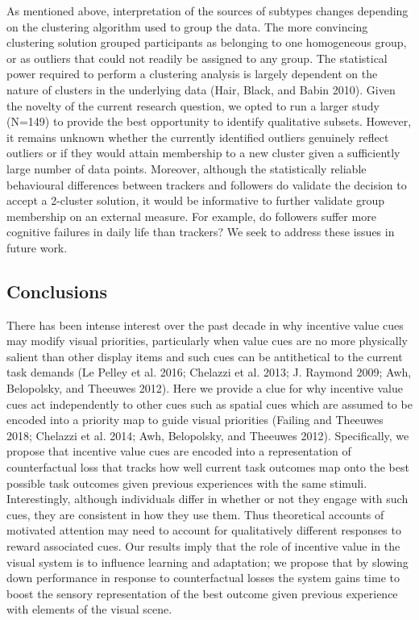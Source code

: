 \documentclass[11pt,halfline,a4paper,]{ouparticle}
\begin{document}
As mentioned above, interpretation of the sources of subtypes changes depending on the clustering algorithm used to group the data. The more convincing clustering solution grouped participants as belonging to one homogeneous group, or as outliers that could not readily be assigned to any group. The statistical power required to perform a clustering analysis is largely dependent on the nature of clusters in the underlying data (Hair, Black, and Babin 2010). Given the novelty of the current research question, we opted to run a larger study (N=149) to provide the best opportunity to identify qualitative subsets. However, it remains unknown whether the currently identified outliers genuinely reflect outliers or if they would attain membership to a new cluster given a sufficiently large number of data points. Moreover, although the statistically reliable behavioural differences between trackers and followers do validate the decision to accept a 2-cluster solution, it would be informative to further validate group membership on an external measure. For example, do followers suffer more cognitive failures in daily life than trackers? We seek to address these issues in future work.

\hypertarget{conclusions}{%
\subsection{Conclusions}\label{conclusions}}

\label{sec:conclusions}

There has been intense interest over the past decade in why incentive value cues may modify visual priorities, particularly when value cues are no more physically salient than other display items and such cues can be antithetical to the current task demands (Le Pelley et al. 2016; Chelazzi et al. 2013; J. Raymond 2009; Awh, Belopolsky, and Theeuwes 2012). Here we provide a clue for why incentive value cues act independently to other cues such as spatial cues which are assumed to be encoded into a priority map to guide visual priorities (Failing and Theeuwes 2018; Chelazzi et al. 2014; Awh, Belopolsky, and Theeuwes 2012). Specifically, we propose that incentive value cues are encoded into a representation of counterfactual loss that tracks how well current task outcomes map onto the best possible task outcomes given previous experiences with the same stimuli. Interestingly, although individuals differ in whether or not they engage with such cues, they are consistent in how they use them. Thus theoretical accounts of motivated attention may need to account for qualitatively different responses to reward associated cues. Our results imply that the role of incentive value in the visual system is to influence learning and adaptation; we propose that by slowing down performance in response to counterfactual losses the system gains time to boost the sensory representation of the best outcome given previous experience with elements of the visual scene.
\end{document}
